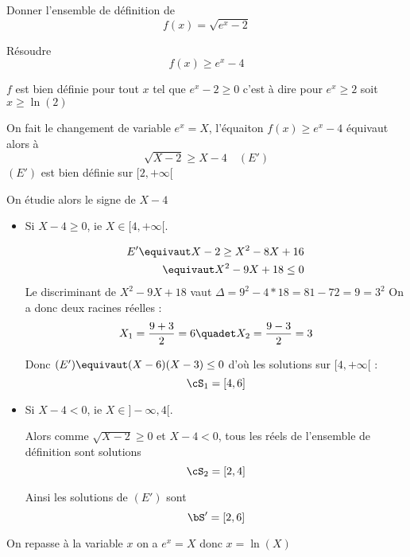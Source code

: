 


\begin{exercice}
Donner l'ensemble de définition de 
$$f(x) = \sqrt{e^x-2}$$

Résoudre $$f(x)\geq e^{x}-4$$
\end{exercice}

\begin{correction}
$f$ est bien définie pour tout $x$ tel que $e^x-2\geq 0$ c'est à dire pour $e^x\geq2$ soit $x\geq \ln(2)$

\conclusion{ $D_f =[\ln(2),+\infty[$}

On fait le changement de variable $e^x=X$, l'équaiton $f(x) \geq e^x-4$ équivaut alors à 
$$\sqrt{X-2} \geq X-4 \quad (E')$$
$(E')$ est bien définie sur $[2,+\infty[$

On étudie alors le signe de $X-4$

\begin{itemize}
\item Si $X-4\geq 0$, ie $X\in [4,+\infty[$. 

\begin{align*}
E' \equivaut X-2 \geq X^2 - 8X +16\\
	\equivaut X^2 -9X +18\leq 0
\end{align*}
Le discriminant de $X^2 -9X +18$ vaut $\Delta =9^2 - 4*18 = 81- 72 =9=3^2$
On a donc deux racines réelles : 
$$X_1= \frac{9 +3}{2} = 6 \quadet X_2 = \frac{9-3}{2}= 3$$

Donc $(E') \equivaut  (X-6)(X-3)\leq 0$ d'où les solutions sur $ [4,+\infty[$ : 
$$\cS_1= [4,6]$$


\item Si $X-4<0$, ie $X\in ]-\infty,4[$. 

Alors comme $\sqrt{X-2} \geq 0$  et $X-4<0$, tous les réels de l'ensemble de définition sont solutions 
$$\cS_2 = [2,4]$$


Ainsi les solutions de $(E')$ sont 
$$\bS' = [2,6]$$



\end{itemize}

On repasse à la variable $x$ on a $e^x =X$ donc $x =\ln(X)$


\end{correction}